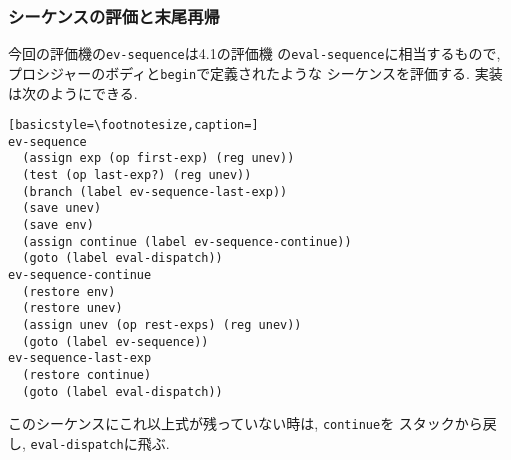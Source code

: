 \subsubsection{シーケンスの評価と末尾再帰}
今回の評価機の\lstinline{ev-sequence}は4.1の評価機%
の\lstinline{eval-sequence}に相当するもので,
プロシジャーのボディと\lstinline{begin}で定義されたような%
シーケンスを評価する. 実装は次のようにできる.

\begin{lstlisting}[basicstyle=\footnotesize,caption=]
ev-sequence
  (assign exp (op first-exp) (reg unev))
  (test (op last-exp?) (reg unev))
  (branch (label ev-sequence-last-exp))
  (save unev)
  (save env)
  (assign continue (label ev-sequence-continue))
  (goto (label eval-dispatch))
ev-sequence-continue
  (restore env)
  (restore unev)
  (assign unev (op rest-exps) (reg unev))
  (goto (label ev-sequence))
ev-sequence-last-exp
  (restore continue)
  (goto (label eval-dispatch))
\end{lstlisting}

このシーケンスにこれ以上式が残っていない時は, \lstinline{continue}を%
スタックから戻し, \lstinline{eval-dispatch}に飛ぶ.
